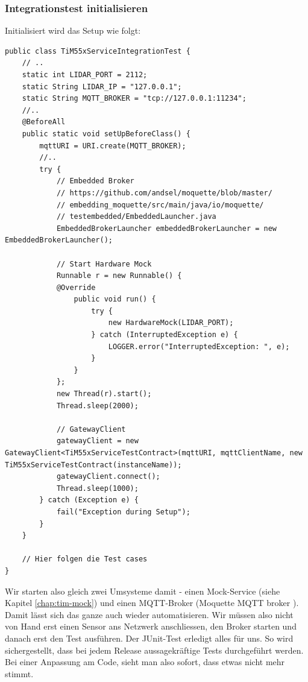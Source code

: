 \subsubsection{Integrationstest initialisieren}
Initialisiert wird das Setup wie folgt:
\begin{lstlisting}[caption={Integrations-Test Setup für TiM55x},label={lst:integrationstest-tim55x-setup}]
public class TiM55xServiceIntegrationTest {
    // ..
    static int LIDAR_PORT = 2112;
    static String LIDAR_IP = "127.0.0.1";
    static String MQTT_BROKER = "tcp://127.0.0.1:11234";
    //.. 
    @BeforeAll
    public static void setUpBeforeClass() {
        mqttURI = URI.create(MQTT_BROKER);
        //..
        try {
            // Embedded Broker
            // https://github.com/andsel/moquette/blob/master/
            // embedding_moquette/src/main/java/io/moquette/
            // testembedded/EmbeddedLauncher.java
            EmbeddedBrokerLauncher embeddedBrokerLauncher = new EmbeddedBrokerLauncher();

            // Start Hardware Mock
            Runnable r = new Runnable() {
            @Override
                public void run() {
                    try {
                        new HardwareMock(LIDAR_PORT);
                    } catch (InterruptedException e) {
                        LOGGER.error("InterruptedException: ", e);
                    }
                }
            };
            new Thread(r).start();
            Thread.sleep(2000);

            // GatewayClient
            gatewayClient = new GatewayClient<TiM55xServiceTestContract>(mqttURI, mqttClientName, new TiM55xServiceTestContract(instanceName));
            gatewayClient.connect();
            Thread.sleep(1000);
        } catch (Exception e) {
            fail("Exception during Setup");
        } 
    }
    
    // Hier folgen die Test cases
}
\end{lstlisting}
Wir starten also gleich zwei Umsysteme damit - einen Mock-Service (siehe Kapitel \ref{chap:tim-mock}) und einen MQTT-Broker (Moquette MQTT broker \cite{moquette-mqtt-broker}). Damit lässt sich das ganze auch wieder automatisieren. Wir müssen also nicht von Hand erst einen Sensor ans Netzwerk anschliessen, den Broker starten und danach erst den Test ausführen. Der JUnit-Test erledigt alles für uns. So wird sichergestellt, dass bei jedem Release aussagekräftige Tests durchgeführt werden. Bei einer Anpassung am Code, sieht man also sofort, dass etwas nicht mehr stimmt. 

